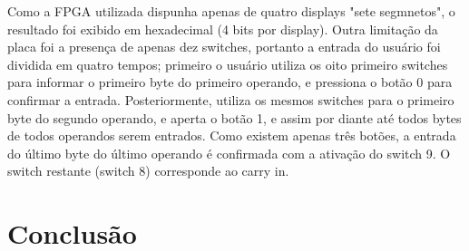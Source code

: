 \documentclass[12pt]{article}
\begin{document}
Como a FPGA utilizada dispunha apenas de quatro displays "sete segmnetos", o
resultado foi exibido em hexadecimal (4 bits por display). Outra limitação da
placa foi a presença de apenas dez switches, portanto a entrada do usuário foi
dividida em quatro tempos; primeiro o usuário utiliza os oito primeiro switches
para informar o primeiro byte do primeiro operando, e pressiona o botão 0 para
confirmar a entrada. Posteriormente, utiliza os mesmos switches para o primeiro
byte do segundo operando, e aperta o botão 1, e assim por diante até todos
bytes de todos operandos serem entrados. Como existem apenas três botões, a
entrada do último byte do último operando é confirmada com a ativação do switch
9. O switch restante (switch 8) corresponde ao carry in.

\section{Conclusão}





\end{document}
